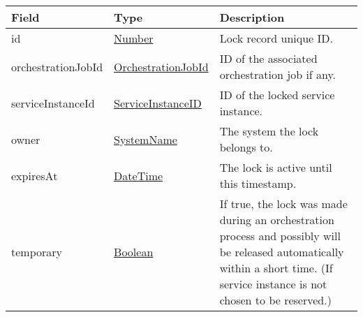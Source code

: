 \documentclass[a4paper]{arrowhead}
\newcommand{\pref}[1]{{\textcolor{ArrowheadGrey}{\hyperref[sec:model:primitives:#1]{#1}}}}
\begin{document}
\begin{table}[ht!]
\begin{tabularx}{\textwidth}{| p{3cm} | p{6.8cm} | X |} \hline
\rowcolor{gray!33} Field & Type & Description \\ \hline
id & \pref{Number} & Lock record unique ID. \\ \hline
orchestrationJobId & \pref{OrchestrationJobId} & ID of the associated orchestration job if any. \\ \hline
serviceInstanceId & \pref{ServiceInstanceID} & ID of the locked service instance. \\ \hline
owner & \pref{SystemName} & The system the lock belongs to. \\ \hline
expiresAt & \pref{DateTime} & The lock is active until this timestamp. \\ \hline
temporary & \pref{Boolean} & If true, the lock was made during an orchestration process and possibly will be released automatically within a short time. (If service instance is not chosen to be reserved.) \\ \hline
\end{tabularx}
\end{table}

\end{document}
